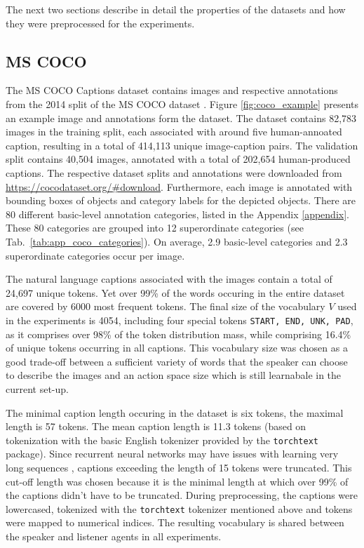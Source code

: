 The next two sections describe in detail the properties of the datasets and how they were preprocessed for the experiments.

\subsection{MS COCO}
\label{ds:coco}
The MS COCO Captions dataset \parencite{chen2015microsoft} contains images and respective annotations from the 2014 split of the MS COCO dataset \parencite{lin2014microsoft}. Figure \ref{fig:coco_example} presents an example image and annotations form the dataset. The dataset contains 82,783 images in the training split, each associated with around five human-annoated caption, resulting in a total of 414,113 unique image-caption pairs. The validation split contains 40,504 images, annotated with a total of 202,654 human-produced captions. The respective dataset splits and annotations were downloaded from \url{https://cocodataset.org/#download}.
Furthermore, each image is annotated with bounding boxes of objects and category labels for the depicted objects. There are 80 different basic-level annotation categories, listed in the Appendix \ref{appendix}. These 80 categories are grouped into 12 superordinate categories (see Tab.~\ref{tab:app_coco_categories}).
On average, 2.9 basic-level categories and 2.3 superordinate categories occur per image.

The natural language captions associated with the images contain a total of 24,697 unique tokens. Yet over 99\% of the words occuring in the entire dataset are covered by 6000 most frequent tokens. 
The final size of the vocabulary $V$ used in the experiments is 4054, including four special tokens \texttt{START, END, UNK, PAD}, as it comprises over 98\% of the token distribution mass, while comprising 16.4\% of unique tokens occurring in all captions. This vocabulary size was chosen as a good trade-off between a sufficient variety of words that the speaker can choose to describe the images and an action space size which is still learnabale in the current set-up. 

The minimal caption length occuring in the dataset is six tokens, the maximal length is 57 tokens. The mean caption length is 11.3 tokens (based on tokenization with the basic English tokenizer provided by the \texttt{torchtext} package). Since recurrent neural networks may have issues with learning very long sequences \parencite[e. g.,][]{jaeger2002tutorial}, captions exceeding the length of 15 tokens were truncated. This cut-off length was chosen because it is the minimal length at which over 99\% of the captions didn't have to be truncated. %
During preprocessing, the captions were lowercased, tokenized with the \texttt{torchtext} tokenizer mentioned above and tokens were mapped to numerical indices. The resulting vocabulary is shared between the speaker and listener agents in all experiments. 

